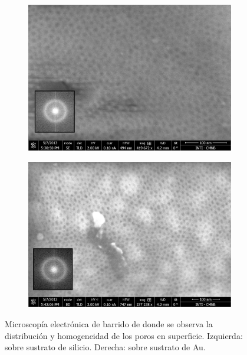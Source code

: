 			\begin{figure}[th]
		 	   	    \begin{subfigure}[t]{0.49\textwidth}
			        	\includegraphics[width=\textwidth]{Imagenes/F127_Si_sup.jpg}
			       		\end{subfigure}
					\begin{subfigure}[t]{0.49\textwidth}
			 	   	    \includegraphics[width=\textwidth]{Imagenes/F127_Au_sup.jpg}
			       		\end{subfigure}
					\caption[MEB arreglo poroso sobre Si y Au.]{Microscopía electrónica de barrido de \pdmF\space donde se observa la distribución y homogeneidad de los poros en superficie. Izquierda: sobre sustrato de silicio. Derecha: sobre sustrato de Au.}	 
					 \label{fig:F127_Si_Au}
					 \end{figure}

